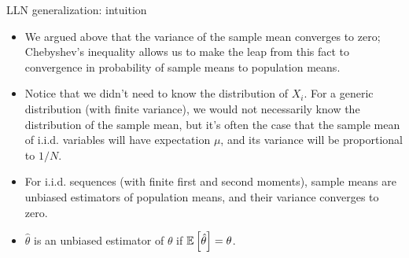 \begin{frame}{LLN generalization: intuition}
\begin{itemize}
	 \item We argued above that the variance of the sample mean converges to zero;
			Chebyshev's inequality allows us to make the leap from this fact to convergence in probability
			of sample means to population means. 


	\item Notice that we didn't need to know the distribution of $X_i$. For a generic distribution (with finite variance), we would not necessarily know the distribution of the sample mean, but it's often the case that the sample mean of i.i.d. variables will have expectation $\mu$, and its variance
	will be proportional to $1/N$.
			

	\medskip
	\item For i.i.d. sequences (with finite first and second moments), sample means are unbiased estimators of population means, and their variance converges to zero.

	\item $\hat{\theta}$ is an \alert{unbiased} estimator of $\theta$ if $\mathbb{E}\left[\hat{\theta}\right] = \theta$.
\end{itemize}
\end{frame}




	
	
	
	

